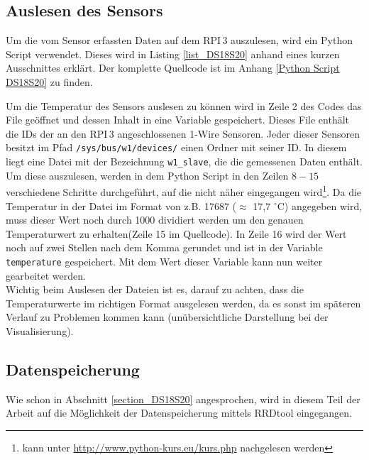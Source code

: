 \subsection{Auslesen des Sensors}
\label{subsection_Auslesen_DS18S20}
Um die vom Sensor erfassten Daten auf dem \ac{RPI}\,3 auszulesen, wird ein Python Script verwendet. Dieses wird in Listing \ref{list_DS18S20} anhand eines kurzen Ausschnittes erklärt. Der komplette Quellcode ist im Anhang \ref{Python Script DS18S20} zu finden.\\



Um die Temperatur des Sensors auslesen zu können wird in Zeile 2 des Codes das File geöffnet und dessen Inhalt in eine Variable gespeichert. Dieses File enthält die IDs der an den \ac{RPI}\,3 angeschlossenen 1-Wire Sensoren. Jeder dieser Sensoren besitzt im Pfad \texttt{/sys/bus/w1/devices/} einen Ordner mit seiner ID. In diesem liegt eine Datei mit der Bezeichnung \texttt{w1\_slave}, die die gemessenen Daten enthält. Um diese auszulesen, werden in dem Python Script in den Zeilen $8-15$ verschiedene Schritte durchgeführt, auf die nicht näher eingegangen wird\footnote{kann unter \url{http://www.python-kurs.eu/kurs.php} nachgelesen werden}. Da die Temperatur in der Datei im Format von z.B. 17687 ($\approx$ 17,7 $^\circ$C) angegeben wird, muss dieser Wert noch durch 1000 dividiert werden um den genauen Temperaturwert zu erhalten(Zeile 15 im Quellcode). In Zeile 16 wird der Wert noch auf zwei Stellen nach dem Komma gerundet und ist in der Variable \texttt{temperature} gespeichert. Mit dem Wert dieser Variable kann nun weiter gearbeitet werden.\\
Wichtig beim Auslesen der Dateien ist es, darauf zu achten, dass die Temperaturwerte im richtigen Format ausgelesen werden, da es sonst im späteren Verlauf zu Problemen kommen kann (unübersichtliche Darstellung bei der Visualisierung).

\subsection{Datenspeicherung}
\label{subsectio_Datenspeicherung_DS18S20}
Wie schon in Abschnitt \ref{section_DS18S20} angesprochen, wird in diesem Teil der Arbeit auf die Möglichkeit der Datenspeicherung mittels RRDtool eingegangen. 

